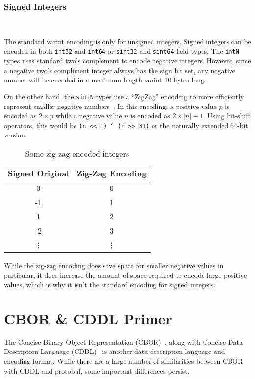 \documentclass[11pt]{article}
\theoremstyle{definition}
\theoremstyle{plain}
\begin{document}
\subsubsection{Signed Integers}~\label{sec:proto-sint}

The standard varint encoding is only for unsigned integers. Signed integers can
be encoded in both \texttt{int32} and \texttt{int64} or \texttt{sint32} and
\texttt{sint64} field types. The \texttt{intN} types uses standard two's
complement to encode negative integers. However, since a negative two's
compliment integer always has the sign bit set, any negative number will be
encoded in a maximum length varint 10 bytes long.

On the other hand, the \texttt{sintN} types use a ``ZigZag'' encoding to more
efficiently represent smaller negative numbers~\cite{Encoding}. In this
encoding, a positive value $p$ is encoded as $2 \times p$ while a negative value $n$
is encoded as $2 \times |n| - 1$. Using bit-shift operators, this would be
\verb|(n << 1) ^ (n >> 31)| or the naturally extended 64-bit version.

\begin{table}[htbp]
  \centering
  \begin{tabular}{cc}
    \toprule
    Signed Original & Zig-Zag Encoding \\
    \midrule
    0 & 0 \\
    -1 & 1 \\
    1 & 2 \\
    -2 & 3 \\
    \vdots & \vdots \\
    \bottomrule
  \end{tabular}
\caption{Some zig zag encoded integers}
\label{tab:zigzag}
\end{table}

While the zig-zag encoding does save space for smaller negative values in
particular, it does increase the amount of space required to encode large
positive values, which is why it isn't the standard encoding for signed
integers. 

\section{CBOR \& CDDL Primer}

The Concise Binary Object Representation
(CBOR)~\cite{bormannConciseBinaryObject2020}, along with Concise Data
Description Language (CDDL)~\cite{birkholzConciseDataDefinition2019} is another
data description language and encoding format. While there are a large number of
similarities between CBOR with CDDL and protobuf, some important differences
persist.
\end{document}
